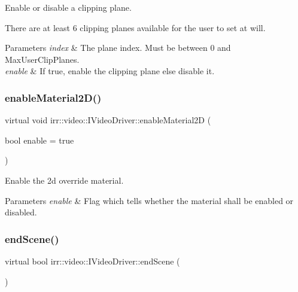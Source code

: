 Enable or disable a clipping plane. 

There are at least 6 clipping planes available for the user to set at will. 
\begin{DoxyParams}{Parameters}
{\em index} & The plane index. Must be between 0 and Max\+User\+Clip\+Planes. \\
\hline
{\em enable} & If true, enable the clipping plane else disable it. \\
\hline
\end{DoxyParams}
\mbox{\label{classirr_1_1video_1_1IVideoDriver_a7686a41fe0f506bb04c262f724f65756}} 
\subsubsection{\texorpdfstring{enable\+Material2\+D()}{enableMaterial2D()}}
{\footnotesize\ttfamily virtual void irr\+::video\+::\+I\+Video\+Driver\+::enable\+Material2D (\begin{DoxyParamCaption}\item[{bool}]{enable = {\ttfamily true} }\end{DoxyParamCaption})\hspace{0.3cm}{\ttfamily [pure virtual]}}



Enable the 2d override material. 


\begin{DoxyParams}{Parameters}
{\em enable} & Flag which tells whether the material shall be enabled or disabled. \\
\hline
\end{DoxyParams}
\mbox{\label{classirr_1_1video_1_1IVideoDriver_a75f61a93c5fc9fdf161c044d27bc994e}} 
\subsubsection{\texorpdfstring{end\+Scene()}{endScene()}}
{\footnotesize\ttfamily virtual bool irr\+::video\+::\+I\+Video\+Driver\+::end\+Scene (\begin{DoxyParamCaption}{ }\end{DoxyParamCaption})\hspace{0.3cm}{\ttfamily [pure virtual]}}



